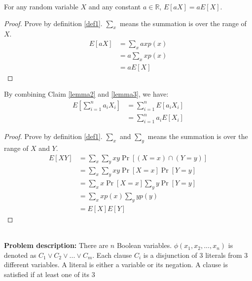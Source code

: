 \begin{lemma}\label{lemma3}
For any random variable $X$ and any constant $a \in \mathbb{R}$, $E[aX]=aE[X]$.
\end{lemma}
\begin{proof}
Prove by definition \ref{def1}.
$\sum_x$ means the summation is over the range of $X$.
\begin{align}
    \nonumber E[aX]&=\sum_xaxp(x) %
    \\
    \nonumber &=a\sum_xxp(x)%
    \\
    \nonumber &=aE[X]
\end{align}
\end{proof}
By combining Claim \ref{lemma2} and \ref{lemma3}, we have:
\begin{align}
    \nonumber E[\sum_{i=1}^na_iX_i]&=\sum_{i=1}^nE[a_iX_i]\\
    \nonumber&=\sum_{i=1}^{n}a_iE[X_i]
\end{align}
\begin{proof}
Prove by definition \ref{def1}.
$\sum_x$ and $\sum_y$ means the summation is over the range of $X$ and $Y$.
\begin{align}
    \nonumber E[XY]&=\sum_x\sum_yxy\Pr[(X=x)\cap(Y=y)]\\
    \nonumber &=\sum_x\sum_yxy\Pr[X=x]\Pr[Y=y]\\
    \nonumber&=\sum_xx\Pr[X=x]\sum_yy\Pr[Y=y]\\
    \nonumber&=\sum_xxp(x)\sum_yyp(y)\\
    \nonumber&=E[X]E[Y]
\end{align}
\end{proof}
\noindent{}\\
\textbf{Problem description:} There are $n$ Boolean variables. $\phi(x_1,x_2,...,x_n)$ is denoted as $C_1 \vee C_2 \vee...\vee C_m$. Each clause $C_i$ is a disjunction of $3$ literals from $3$ different variables. A literal is either a variable or its negation. A clause is satisfied if at least one of its $3$
